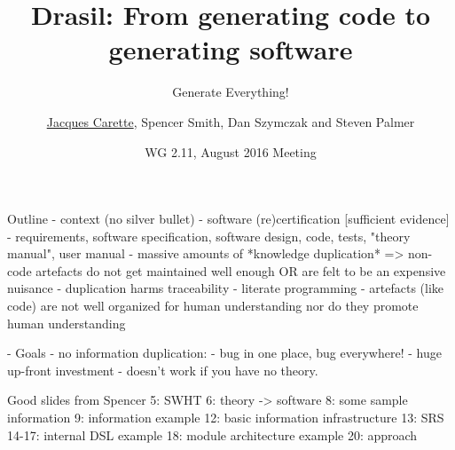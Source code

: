 \documentclass{beamer}
\title[Drasil]{Drasil: From generating code to generating software}
\subtitle{Generate Everything!}
\author{\underline{Jacques Carette}, Spencer Smith, Dan Szymczak and
Steven Palmer}
\institute[McMaster University]{McMaster University}
\date[Aug 2016]{WG 2.11, August 2016 Meeting}
\begin{document}

\begin{frame}
\titlepage
\end{frame}

\begin{frame}
Outline
- context (no silver bullet)
  - software (re)certification [sufficient evidence]
    - requirements, software specification, software design, code, tests,
       "theory manual", user manual
    - massive amounts of *knowledge duplication*
       => non-code artefacts do not get maintained well enough
          OR are felt to be an expensive nuisance
    - duplication harms traceability
  - literate programming
    - artefacts (like code) are not well organized for human understanding
      nor do they promote human understanding

- Goals
  - no information duplication: 
    - bug in one place, bug everywhere!
    - huge up-front investment
    - doesn't work if you have no theory.

Good slides from Spencer
5: SWHT
6: theory -> software
8: some sample information
9: information example
12: basic information infrastructure
13: SRS
14-17: internal DSL example
18: module architecture example
20: approach

\end{frame}
\end{document}
